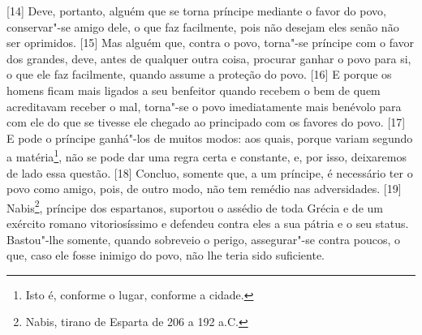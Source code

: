 {[}14{]} Deve, portanto, alguém que se torna príncipe mediante o favor
do povo, conservar"-se amigo dele, o que faz facilmente, pois não desejam
eles senão não ser oprimidos. {[}15{]} Mas alguém que, contra o povo,
torna"-se príncipe com o favor dos grandes, deve, antes de qualquer outra
coisa, procurar ganhar o povo para si, o que ele faz facilmente, quando
assume a proteção do povo. {[}16{]} E porque os homens ficam mais
ligados a seu benfeitor quando recebem o bem de quem acreditavam receber
o mal, torna"-se o povo imediatamente mais benévolo para com ele do que
se tivesse ele chegado ao principado com os favores do povo. {[}17{]} E
pode o príncipe ganhá"-los de muitos modos: aos quais, porque variam
segundo a matéria\footnote{Isto é, conforme o lugar, conforme a cidade.},
não se pode dar uma regra certa e constante, e, por isso, deixaremos de
lado essa questão. {[}18{]} Concluo, somente que, a um príncipe, é
necessário ter o povo como amigo, pois, de outro modo, não tem remédio
nas adversidades. {[}19{]} Nabis\footnote{Nabis, tirano de Esparta de
  206 a 192 a.C.}, príncipe dos espartanos, suportou o assédio de toda
Grécia e de um exército romano vitoriosíssimo e defendeu contra eles a
sua pátria e o seu status. Bastou"-lhe somente, quando sobreveio o
perigo, assegurar"-se contra poucos, o que, caso ele fosse inimigo do
povo, não lhe teria sido suficiente.

